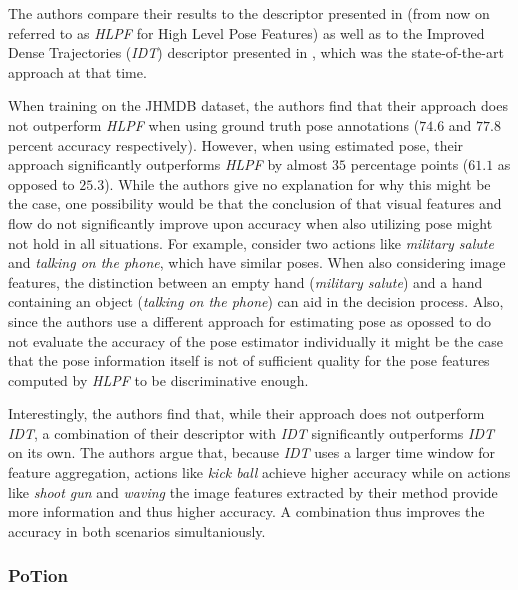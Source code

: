 The authors compare their results to the descriptor presented in  (from now on referred to as \textit{HLPF} for High Level Pose Features) as well as to the Improved Dense Trajectories (\textit{IDT}) descriptor presented in , which was the state-of-the-art approach at that time.

When training on the JHMDB dataset, the authors find that their approach does not outperform \textit{HLPF} when using ground truth pose annotations ($74.6$ and $77.8$ percent accuracy respectively).
However, when using estimated pose, their approach significantly outperforms \textit{HLPF} by almost $35$ percentage points ($61.1$ as opposed to $25.3$).
While the authors give no explanation for why this might be the case, one possibility would be that the conclusion of \cite{jhuang_towards_2013} that visual features and flow do not significantly improve upon accuracy when also utilizing pose might not hold in all situations.
For example, consider two actions like \textit{military salute} and \textit{talking on the phone}, which have similar poses.
When also considering image features, the distinction between an empty hand (\textit{military salute}) and a hand containing an object (\textit{talking on the phone}) can aid in the decision process.
Also, since the authors use a different approach for estimating pose as opossed to \cite{jhuang_towards_2013}  do not evaluate the accuracy of the pose estimator individually it might be the case that the pose information itself is not of sufficient quality for the pose features computed by \textit{HLPF} to be discriminative enough.

Interestingly, the authors find that, while their approach does not outperform \textit{IDT}, a combination of their descriptor with \textit{IDT} significantly outperforms \textit{IDT} on its own.
The authors argue that, because \textit{IDT} uses a larger time window for feature aggregation, actions like \textit{kick ball} achieve higher accuracy while on actions like \textit{shoot gun} and \textit{waving} the image features extracted by their method provide more information and thus higher accuracy.
A combination thus improves the accuracy in both scenarios simultaniously.

\subsubsection{PoTion}
\label{sec:potion}

